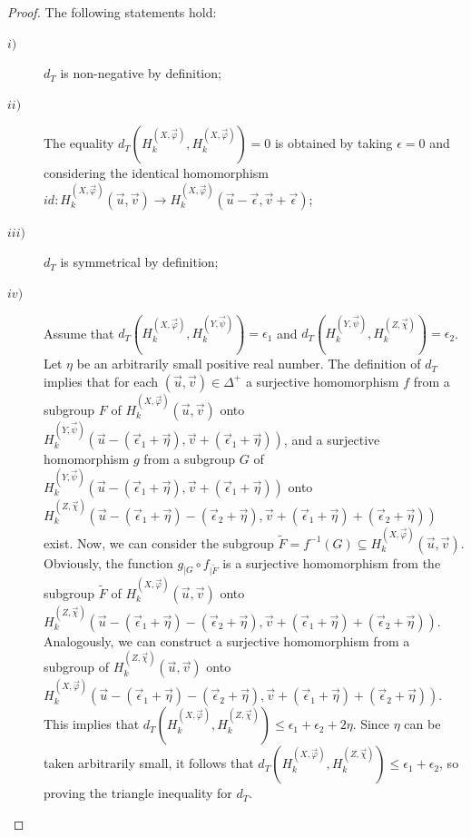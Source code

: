 \documentclass{amsart}
\theoremstyle{definition}
\theoremstyle{remark}
\numberwithin{equation}{section}
\begin{document}
\begin{proof}
The following statements hold:
\begin{description}
\item[$i)$] $d_T$ is non-negative by definition;
\item[$ii)$]The equality $d_T\left( H^{(X,\vec\varphi)}_k, H^{(X,\vec\varphi)}_k\right)=0$ is obtained by taking $\epsilon=0$ and considering the identical homomorphism $id: H^{(X,\vec\varphi)}_k(\vec u,\vec v)\to H^{(X,\vec\varphi)}_k(\vec u-\vec \epsilon,\vec v+\vec \epsilon)$;
\item[$iii)$]$d_T$ is symmetrical by definition;
\item[$iv)$]Assume that $d_T\left( H^{(X,\vec\varphi)}_k, H^{(Y,\vec\psi)}_k\right)=\epsilon_1$ and $d_T\left( H^{(Y,\vec\psi)}_k, H^{(Z,\vec\chi)}_k\right)=\epsilon_2$. Let $\eta$ be an arbitrarily small positive real number. The definition of $d_T$ implies that for each $(\vec u,\vec v)\in \Delta^+$ a surjective homomorphism $f$ from a subgroup $F$ of $ H^{(X,\vec\varphi)}_k(\vec u,\vec v)$ onto $ H^{(Y,\vec\psi)}_k(\vec u-(\vec \epsilon_1+\vec\eta),\vec v+(\vec \epsilon_1+\vec\eta))$, and a surjective homomorphism $g$ from a subgroup $G$ of $ H^{(Y,\vec\psi)}_k(\vec u-(\vec \epsilon_1+\vec\eta),\vec v+(\vec \epsilon_1+\vec\eta))$ onto $ H^{(Z,\vec\chi)}_k(\vec u-(\vec \epsilon_1+\vec\eta)-(\vec \epsilon_2+\vec\eta),\vec v+(\vec \epsilon_1+\vec\eta)+(\vec \epsilon_2+\vec\eta))$ exist. Now, we can consider the subgroup $\tilde{F}=f^{-1}(G)\subseteq  H^{(X,\vec\varphi)}_k(\vec u,\vec v)$. Obviously, the function $g_{|G}\circ f_{|\tilde{F}}$ is a surjective homomorphism from the subgroup $\tilde{F}$ of $ H^{(X,\vec\varphi)}_k(\vec u,\vec v)$ onto $ H^{(Z,\vec\chi)}_k(\vec u-(\vec \epsilon_1+\vec\eta)-(\vec \epsilon_2+\vec\eta),\vec v+(\vec \epsilon_1+\vec\eta)+(\vec \epsilon_2+\vec\eta))$.
    Analogously, we can construct a surjective homomorphism from a subgroup of $ H^{(Z,\vec\chi)}_k(\vec u,\vec v)$ onto $ H^{(X,\vec\varphi)}_k(\vec u-(\vec \epsilon_1+\vec\eta)-(\vec \epsilon_2+\vec\eta),\vec v+(\vec \epsilon_1+\vec\eta)+(\vec \epsilon_2+\vec\eta))$.
    This implies that $d_T\left( H^{(X,\vec\varphi)}_k, H^{(Z,\vec\chi)}_k\right)\le\epsilon_1+\epsilon_2+2\eta$. Since $\eta$ can be taken arbitrarily small, it follows that $d_T\left( H^{(X,\vec\varphi)}_k, H^{(Z,\vec\chi)}_k\right)\le\epsilon_1+\epsilon_2$, so proving the triangle inequality for $d_T$.
\end{description}
\end{proof}
\end{document}
